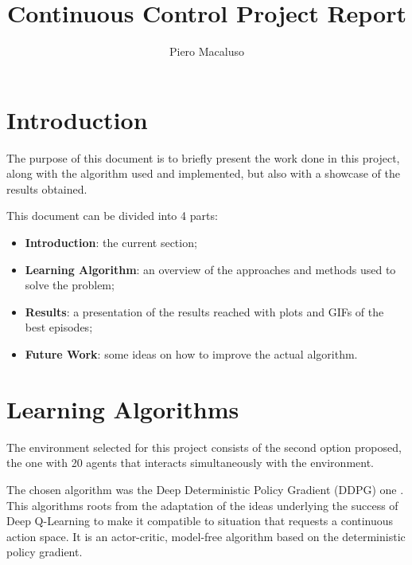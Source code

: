 \documentclass[letterpaper]{article}
\begin{document}
%
\title{Continuous Control Project Report}
\author{Piero Macaluso}
\maketitle

\section{Introduction}

The purpose of this document is to briefly present the work done in this project, along with the algorithm used and implemented, but also with a showcase of the results obtained.

This document can be divided into 4 parts:

\begin{itemize}
\item \textbf{Introduction}: the current section;
\item \textbf{Learning Algorithm}: an overview of the approaches and methods used to solve the problem;
\item \textbf{Results}: a presentation of the results reached with plots and GIFs of the best episodes;
\item \textbf{Future Work}: some ideas on how to improve the actual algorithm.
\end{itemize}

\section{Learning Algorithms}

The environment selected for this project consists of the second option proposed, the one with 20 agents that interacts simultaneously with the environment.

The chosen algorithm was the Deep Deterministic Policy Gradient (DDPG) one \cite{lillicrap2015continuous}. This algorithms roots from the adaptation of the ideas underlying the success of Deep Q-Learning to make it compatible to situation that requests a continuous action space. It is an actor-critic, model-free algorithm based on the deterministic policy gradient.
\end{document}
